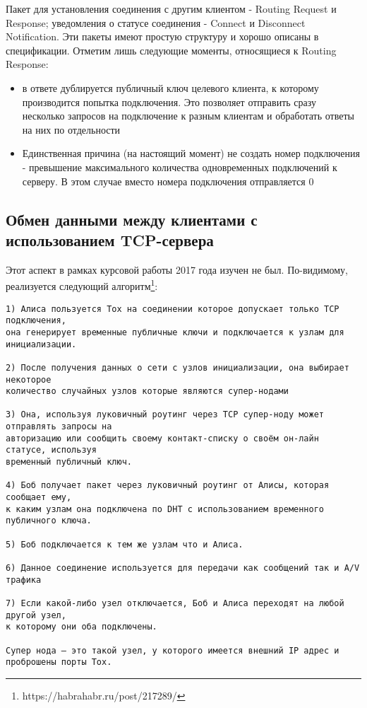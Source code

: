 \documentclass{/home/fresheed/utils/latex/university-templates/lab-report}
\begin{document}
Пакет для установления соединения с другим клиентом - Routing Request и Response; уведомления о статусе соединения - Connect и Disconnect Notification. Эти пакеты имеют простую структуру и хорошо описаны в спецификации. Отметим лишь следующие моменты, относящиеся к Routing Response:
\begin{itemize}
\item в ответе дублируется публичный ключ целевого клиента, к которому производится попытка подключения. Это позволяет отправить сразу несколько запросов на подключение к разным клиентам и обработать ответы на них по отдельности
\item Единственная причина (на настоящий момент) не создать номер подключения - превышение максимального количества одновременных подключений к серверу. В этом случае вместо номера подключения отправляется 0
\end{itemize}

\subsection{Обмен данными между клиентами с использованием TCP-сервера}

Этот аспект в рамках курсовой работы 2017 года изучен не был. По-видимому, реализуется следующий алгоритм\footnote{https://habrahabr.ru/post/217289/}:

\begin{verbatim}
1) Алиса пользуется Tox на соединении которое допускает только TCP подключения,
она генерирует временные публичные ключи и подключается к узлам для инициализации.

2) После получения данных о сети с узлов инициализации, она выбирает некоторое
количество случайных узлов которые являются супер-нодами

3) Она, используя луковичный роутинг через TCP супер-ноду может отправлять запросы на
авторизацию или сообщить своему контакт-списку о своём он-лайн статусе, используя 
временный публичный ключ.

4) Боб получает пакет через луковичный роутинг от Алисы, которая сообщает ему,
к каким узлам она подключена по DHT с использованием временного публичного ключа.

5) Боб подключается к тем же узлам что и Алиса.

6) Данное соединение используется для передачи как сообщений так и A/V трафика

7) Если какой-либо узел отключается, Боб и Алиса переходят на любой другой узел, 
к которому они оба подключены.

Супер нода — это такой узел, у которого имеется внешний IP адрес и проброшены порты Tox. 
\end{verbatim}
\end{document}

